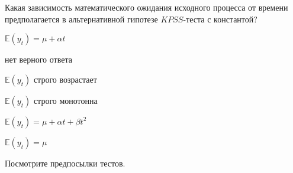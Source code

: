 
\begin{question}
Какая зависимость математического ожидания исходного процесса от времени предполагается в альтернативной гипотезе \(KPSS\)-теста с константой?
\begin{answerlist}
  \item \(\mathbb{E}(y_t) = \mu + \alpha t\)
  \item нет верного ответа
  \item \(\mathbb{E}(y_t)\) строго возрастает
  \item \(\mathbb{E}(y_t)\) строго монотонна
  \item \(\mathbb{E}(y_t) = \mu + \alpha t + \beta t^2\)
  \item \(\mathbb{E}(y_t) = \mu\)
\end{answerlist}
\end{question}

\begin{solution}
Посмотрите предпосылки тестов.
\end{solution}

